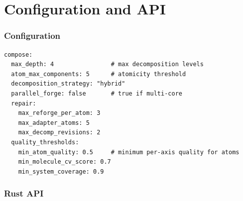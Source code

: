\documentclass[11pt,a4paper,twoside]{article}
\theoremstyle{definition}
\theoremstyle{plain}
\theoremstyle{remark}
\begin{document}
\part{Configuration and API}\label{part:api}

\section{Configuration}\label{sec:config}

\begin{lstlisting}[title={Composition Configuration}]
compose:
  max_depth: 4                # max decomposition levels
  atom_max_components: 5      # atomicity threshold
  decomposition_strategy: "hybrid"
  parallel_forge: false       # true if multi-core
  repair:
    max_reforge_per_atom: 3
    max_adapter_atoms: 5
    max_decomp_revisions: 2
  quality_thresholds:
    min_atom_quality: 0.5     # minimum per-axis quality for atoms
    min_molecule_cv_score: 0.7
    min_system_coverage: 0.9
\end{lstlisting}


\section{Rust API}\label{sec:rustapi}
\end{document}
